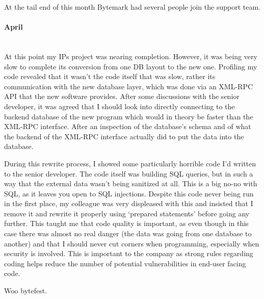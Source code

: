 \documentclass[12pt,a4paper]{article}
\newcommand{\paragraphnl}[1]{\paragraph{#1}\mbox{}\\}
\begin{document}
	At the tail end of this month Bytemark had several people join the support
	team.

\paragraphnl{April}
	At this point my IPs project was nearing completion. However, it was being
	very slow to complete its conversion from one DB layout to the new one.
	Profiling my code revealed that it wasn't the code itself that was slow,
	rather its communication with the new database layer, which was done via an
	XML-RPC API that the new software provides. After some discussions with the
	senior developer, it was agreed that I should look into directly connecting
	to the backend database of the new program which would in theory be faster
	than the XML-RPC interface. After an inspection of the database's schema and
	of what the backend of the XML-RPC interface actually did to put the data
	into the database.

	During this rewrite process, I showed some particularly horrible code I'd
	written to the senior developer. The code itself was building SQL queries,
	but in such a way that the external data wasn't being sanitized at all. This
	is a big no-no with SQL, as it leaves you open to SQL injections. Despite
	this code never being run in the first place, my colleague was very
	displeased with this and insisted that I remove it and rewrite it properly
	using `prepared statements' before going any further. This taught me that
	code quality is important, as even though in this case there was almost no
	real danger (the data was going from one database to another) and that I
	should never cut corners when programming, especially when security is
	involved. This is important to the company as strong rules regarding coding
	helps reduce the number of potential vulnerabilities in end-user facing
	code.

	Woo bytefest.


\end{document}
